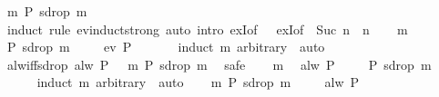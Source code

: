 \begin{isabellebody}
\ {\isachardoublequoteopen}{\isasymexists}m{\isachardot}\ P\ {\isacharparenleft}sdrop\ m\ {\isasymomega}{\isacharparenright}{\isachardoublequoteclose}\isanewline
\ \ \ \ \isamarkupfalse%
\ {\isacharparenleft}induct\ rule{\isacharcolon}\ ev{\isacharunderscore}induct{\isacharunderscore}strong{\isacharparenright}\ {\isacharparenleft}auto\ intro{\isacharcolon}\ exI{\isacharbrackleft}of\ {\isacharunderscore}\ {}{\isacharbrackright}\ exI{\isacharbrackleft}of\ {\isacharunderscore}\ {\isachardoublequoteopen}Suc\ n{\isachardoublequoteclose}\ \ n{\isacharbrackright}{\isacharparenright}\isanewline
{}\isamarkupfalse%
\isanewline
\ \ \isamarkupfalse%
\ m\ \isamarkupfalse%
\ {\isachardoublequoteopen}P\ {\isacharparenleft}sdrop\ m\ {\isasymomega}{\isacharparenright}{\isachardoublequoteclose}\ \isamarkupfalse%
\ \isamarkupfalse%
\ {\isachardoublequoteopen}ev\ P\ {\isasymomega}{\isachardoublequoteclose}\isanewline
\ \ \ \ \isamarkupfalse%
\ {\isacharparenleft}induct\ m\ arbitrary{\isacharcolon}\ {\isasymomega}{\isacharparenright}\ auto\isanewline
{}\isamarkupfalse%
%
\endisatagproof
{\isafoldproof}%
%
\isadelimproof
\isanewline
%
\endisadelimproof
\isanewline
{}\isamarkupfalse%
\ alw{\isacharunderscore}iff{\isacharunderscore}sdrop{\isacharcolon}\ {\isachardoublequoteopen}alw\ P\ {\isasymomega}\ {\isasymlongleftrightarrow}\ {\isacharparenleft}{\isasymforall}m{\isachardot}\ P\ {\isacharparenleft}sdrop\ m\ {\isasymomega}{\isacharparenright}{\isacharparenright}{\isachardoublequoteclose}\isanewline
%
\isadelimproof
%
\endisadelimproof
%
\isatagproof
{}\isamarkupfalse%
\ safe\isanewline
\ \ \isamarkupfalse%
\ m\ \isamarkupfalse%
\ {\isachardoublequoteopen}alw\ P\ {\isasymomega}{\isachardoublequoteclose}\ \isamarkupfalse%
\ \isamarkupfalse%
\ {\isachardoublequoteopen}P\ {\isacharparenleft}sdrop\ m\ {\isasymomega}{\isacharparenright}{\isachardoublequoteclose}\isanewline
\ \ \ \ \isamarkupfalse%
\ {\isacharparenleft}induct\ m\ arbitrary{\isacharcolon}\ {\isasymomega}{\isacharparenright}\ auto\isanewline
{}\isamarkupfalse%
\isanewline
\ \ \isamarkupfalse%
\ {\isachardoublequoteopen}{\isasymforall}m{\isachardot}\ P\ {\isacharparenleft}sdrop\ m\ {\isasymomega}{\isacharparenright}{\isachardoublequoteclose}\ \isamarkupfalse%
\ \isamarkupfalse%
\ {\isachardoublequoteopen}alw\ P\ {\isasymomega}{\isachardoublequoteclose}\isanewline

\end{isabellebody}

